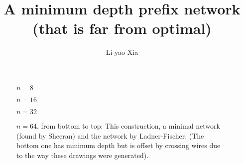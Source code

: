 \documentclass[11pt]{article}
\begin{document}
\title{A minimum depth prefix network (that is far from optimal)}

\author{Li-yao Xia}%

\maketitle




\newpage



\begin{figure}
  
  \caption{$n=8$}
\end{figure}

\begin{figure}
  
  \caption{$n=16$}
\end{figure}

\begin{figure}
  
  \caption{$n=32$}
\end{figure}

\begin{sidewaysfigure}
  
  \caption{$n=64$, from bottom to top:
  This construction, a minimal network (found by Sheeran)
  and the network by Ladner-Fischer.
  (The bottom one has minimum depth but
  is offset by crossing wires due to the way these drawings were generated).}
\end{sidewaysfigure}
\end{document}
